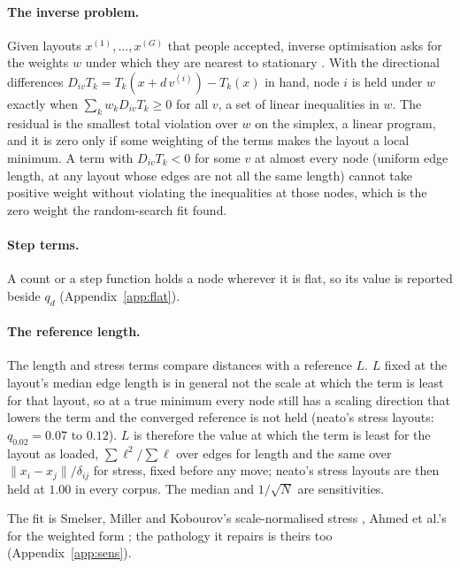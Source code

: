 \documentclass[a4paper,UKenglish]{gd-lipics-v3}
\begin{document}
\paragraph{The inverse problem.} Given layouts $x^{(1)}, \dots, x^{(G)}$ that people
accepted, inverse optimisation asks for the weights $w$ under which they are nearest to stationary \cite{keshavarz11, chan19}. With the directional differences
$D_{iv} T_k = T_k(x + d\,v^{(i)}) - T_k(x)$ in hand, node $i$ is held under $w$ exactly when $\sum_k w_k D_{iv} T_k \ge 0$ for all $v$, a set of linear inequalities in $w$. The residual is the smallest total violation over $w$ on the simplex, a linear program, and it is zero only if some weighting of the terms makes the layout a local minimum. A term with $D_{iv} T_k < 0$ for some $v$ at almost every node (uniform edge length, at any layout whose edges are not all the same length) cannot take positive weight without violating the inequalities at those nodes, which is the zero weight the random-search fit found.

\paragraph{Step terms.} A count or a step function holds a node wherever it is flat,
so its value is reported beside $q_d$ (Appendix~\ref{app:flat}).

\paragraph{The reference length.} The length and stress terms compare distances with a
reference $L$. $L$ fixed at the layout's median edge length is in general not the scale at
which the term is least for that layout, so at a true minimum every node still has a
scaling direction that lowers the term and the converged reference is not held (neato's
stress layouts: $q_{0.02} = 0.07$ to $0.12$). $L$ is therefore the value at which the term is
least for the layout as loaded, $\sum \ell^2 / \sum \ell$ over edges for length and the same
over $\|x_i - x_j\| / \delta_{ij}$ for stress, fixed before any move; neato's stress
layouts are then held at $1.00$ in every corpus. The median and $1/\sqrt{N}$ are
sensitivities.

The fit is Smelser, Miller and Kobourov's scale-normalised stress \cite{smelser24},
Ahmed et al.'s for the weighted form \cite{ahmed24}; the pathology it repairs is
theirs too (Appendix~\ref{app:sens}).
\end{document}
